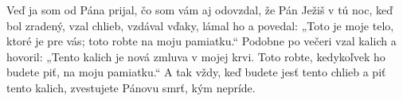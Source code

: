 Veď ja som od Pána prijal, čo som vám aj odovzdal, že Pán Ježiš v tú noc, keď bol zradený, vzal chlieb,
vzdával vďaky, lámal ho a povedal: „Toto je moje telo, ktoré je pre vás; toto robte na moju pamiatku.“
Podobne po večeri vzal kalich a hovoril: „Tento kalich je nová zmluva v mojej krvi. Toto robte, kedykoľvek ho budete piť, na moju pamiatku.“ 
A tak vždy, keď budete jesť tento chlieb a piť tento kalich, zvestujete Pánovu smrť, kým nepríde. 